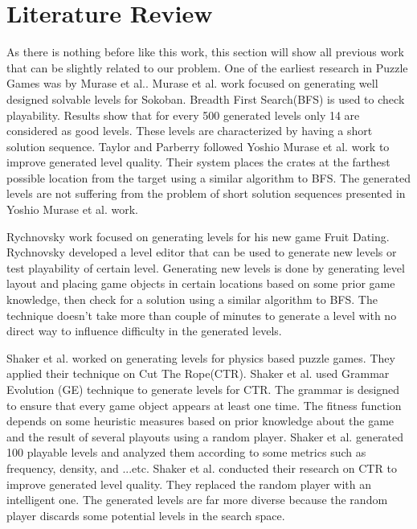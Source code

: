 \documentclass[letterpaper]{article}
\begin{document}
\section{Literature Review}
As there is nothing before like this work, this section will show all previous work that can be slightly related to our problem. One of the earliest research in Puzzle Games was by Murase et al.\cite{sokobanLevelGenerationOld}. Murase et al. work focused on generating well designed solvable levels for Sokoban\cite{sokoban}. Breadth First Search(BFS) is used to check playability. Results show that for every 500 generated levels only 14 are considered as good levels. These levels are characterized by having a short solution sequence. Taylor and Parberry\cite{sokobanLevelGenerationNew} followed Yoshio Murase et al. work\cite{sokobanLevelGenerationOld} to improve generated level quality. Their system places the crates at the farthest possible location from the target using a similar algorithm to BFS. The generated levels are not suffering from the problem of short solution sequences presented in Yoshio Murase et al. work\cite{sokobanLevelGenerationOld}.\\\par

Rychnovsky\cite{fruitDatingPCG} work focused on generating levels for his new game Fruit Dating\cite{fruitDating}. Rychnovsky developed a level editor that can be used to generate new levels or test playability of certain level. Generating new levels is done by generating level layout and placing game objects in certain locations based on some prior game knowledge, then check for a solution using a similar algorithm to BFS. The technique doesn't take more than couple of minutes to generate a level with no direct way to influence difficulty in the generated levels.\\\par

Shaker et al.\cite{ctrAutomaticGeneration} worked on generating levels for physics based puzzle games. They applied their technique on Cut The Rope(CTR)\cite{cutTheRope}. Shaker et al. used Grammar Evolution (GE) technique to generate levels for CTR. The grammar is designed to ensure that every game object appears at least one time. The fitness function depends on some heuristic measures based on prior knowledge about the game and the result of several playouts using a random player. Shaker et al. generated 100 playable levels and analyzed them according to some metrics such as frequency, density, and ...etc. Shaker et al.\cite{ctrSimulationApproach} conducted their research on CTR to improve generated level quality. They replaced the random player with an intelligent one. The generated levels are far more diverse because the random player discards some potential levels in the search space.\\\par
\end{document}
